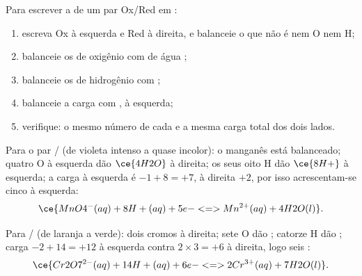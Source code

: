 \begin{method}\label{met:g11:redox:balance}
Para escrever a  de um par Ox/Red em :
\begin{enumerate}
  \item escreva Ox à esquerda e Red à direita, e balanceie o  que
        não é nem O nem H;
  \item balanceie os  de oxigênio com  de água ;
  \item balanceie os  de hidrogênio com  ;
  \item balanceie a carga com  , à esquerda;
  \item verifique: o mesmo número de cada  e a mesma carga total
        dos dois lados.
\end{enumerate}
\end{method}

\begin{example}\label{ex:g11:redox:permanganate}
Para o par / (de violeta intenso a quase incolor):
o manganês está balanceado; quatro O à esquerda dão $\ce{4H2O}$ à
direita; os seus oito H dão $\ce{8H+}$ à esquerda; a carga à esquerda é
$-1 + 8 = +7$, à direita $+2$, por isso acrescentam-se cinco  à
esquerda:
\[
  \ce{MnO4^-(aq) + 8H+(aq) + 5e- <=> Mn^{2+}(aq) + 4H2O(l)}.
\]
\end{example}

\begin{example}\label{ex:g11:redox:dichromate}
Para / (de laranja a verde): dois cromos à
direita; sete O dão ; catorze H dão ; carga
$-2 + 14 = +12$ à esquerda contra $2 \times 3 = +6$ à direita, logo seis
:
\[
  \ce{Cr2O7^{2-}(aq) + 14H+(aq) + 6e- <=> 2Cr^{3+}(aq) + 7H2O(l)}.
\]
\end{example}

